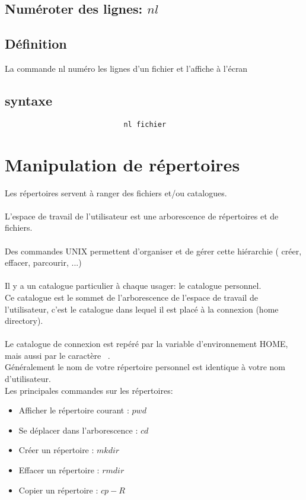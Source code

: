 			\subsection{Numéroter des lignes: $nl$}
					\subsection{Définition}	
						La commande nl numéro les lignes d'un fichier et l'affiche à l'écran
					\subsection{syntaxe}					
						\begin{verbatim}
							nl fichier
						\end{verbatim}														
		\section{Manipulation de répertoires}
		Les répertoires servent à ranger des fichiers et/ou catalogues.\\ \\
		L'espace de travail de l'utilisateur est une arborescence de répertoires et de fichiers.\\ \\
		Des commandes UNIX permettent d'organiser et de gérer cette hiérarchie ( créer, effacer, parcourir, ...)\\ \\
		Il y a un catalogue particulier à chaque usager: le catalogue personnel.\\ 
		Ce catalogue est le sommet de l'arborescence de l'espace de travail de l'utilisateur, c'est le catalogue dans lequel il est placé à la connexion (home directory).\\ \\

		Le catalogue de connexion est repéré par la variable d'environnement HOME, mais aussi par le caractère ~.\\
		Généralement le nom de votre répertoire personnel est identique à votre nom d'utilisateur.\\
		Les principales commandes sur les répertoires:\\
		\begin{itemize}
			\item Afficher le répertoire courant : $pwd$
			\item Se déplacer dans l'arborescence : $cd$
			\item Créer un répertoire : $mkdir$
			\item Effacer un répertoire : $rmdir$
			\item Copier un répertoire : $cp -R$
		\end{itemize}
